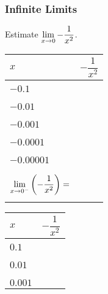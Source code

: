 \documentclass[notes]{subfiles}
\begin{document}
	\subsubsection*{Infinite Limits}
		\begin{ex}
			Estimate \(\displaystyle \lim_{x\to 0} -\dfrac{1}{x^2}\).
			\begin{center}
				\begin{minipage}{.45\textwidth}
					\tabulinesep=1mm
					\begin{tabu}{|X[c]|X[1.5,c]|}\hline
						\(x\) 						& \(-\dfrac{1}{x^2}\) \\ \hline
												& \\
						\(-0.1\)					& \\ 
												& \\ \hline
												& \\
						\(-0.01\)	& \\
												& \\ \hline 
												& \\
						\(-0.001\)	& \\ 
												& \\ \hline
												& \\ 
						\(-0.0001\)	& \\ 
												& \\ \hline
												& \\
						\(-0.00001\)	&\\
												&\\ \hline\hline
												&\\
						\(\displaystyle \lim_{x\to 0^-}\left( -\dfrac{1}{x^2}\right) =\) & \\
												&\\ \hline
					\end{tabu}
				\end{minipage}
				\begin{minipage}{.45\textwidth}
					\tabulinesep=1mm
					\begin{tabu}{|X[c]|X[1.5,c]|}\hline
						\(x\) 						& \(-\dfrac{1}{x^2}\) \\ \hline
												& \\
						\(0.1\)					& \\ 
												& \\ \hline
												& \\
						\(0.01\)	& \\
												& \\ \hline 
												& \\
						\(0.001\)	& \\ 

\end{tabu}
\end{minipage}
\end{center}
\end{ex}
\end{document}
